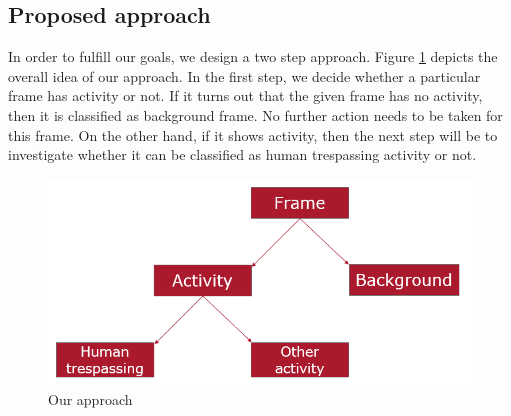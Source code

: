 \subsection{Proposed approach}
\label{sec:approach}
In order to fulfill our goals, we design a two step approach. Figure \ref{fig:trespassing-detection-framework} depicts the overall idea of our approach.  In the first step, we decide whether a particular frame has activity or not. If it turns out that the given frame has no activity, then it is classified as background frame. No further action needs to be taken for this frame. On the other hand, if it shows activity, then the next step will be to investigate whether it can be classified as human trespassing activity or not.

\begin{figure}
    \centering
    \includegraphics[width=\linewidth]{images/trespassing-detection-framework.PNG}
    \caption{Our approach}
    \label{fig:trespassing-detection-framework}
\end{figure}



\newpage
